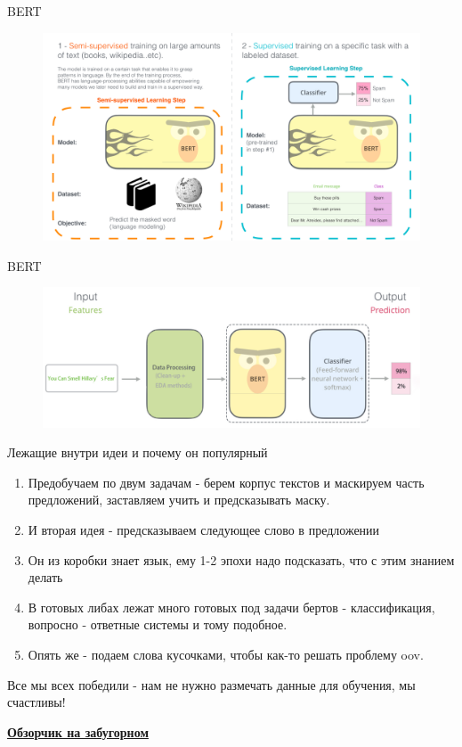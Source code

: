 \documentclass[notes,12pt, aspectratio=169]{beamer}
\begin{document}
\begin{frame}{BERT}

\begin{figure}
	\centering
	\includegraphics[width=0.9\linewidth]{images/BERT_stud}
	\label{fig:seq2seq}
\end{figure}

\end{frame}


\begin{frame}{BERT}
\begin{figure}
	\centering
	\includegraphics[width=0.9\linewidth]{images/use_bert}
	\label{fig:seq2seq}
\end{figure}
\end{frame}

\begin{frame}{Лежащие внутри идеи и почему он популярный}
\begin{enumerate}
	\item Предобучаем по двум задачам - берем корпус текстов и маскируем часть предложений, заставляем учить и предсказывать маску.
	\item И вторая идея - предсказываем следующее слово в предложении
	\item Он из коробки знает язык, ему 1-2 эпохи надо подсказать, что с этим знанием делать
	\item В готовых либах лежат много готовых под задачи бертов - классификация, вопросно - ответные системы и тому подобное.
	\item Опять же - подаем слова кусочками, чтобы как-то решать проблему oov.
\end{enumerate}
Все мы всех победили - нам не нужно размечать данные для обучения, мы счастливы!

\href{http://jalammar.github.io/illustrated-bert/}{\textbf{Обзорчик на забугорном}}
\end{frame}
\end{document}
